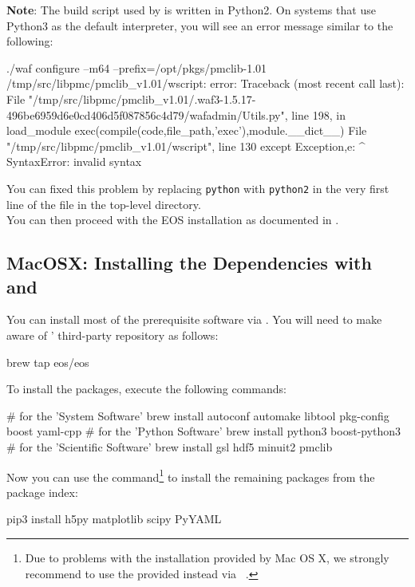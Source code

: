 \textbf{Note}: The  build script used by  is written in Python2. On
systems that use Python3 as the default interpreter, you will see an error message similar
to the following:
\begin{file}
./waf configure --m64 --prefix=/opt/pkgs/pmclib-1.01
/tmp/src/libpmc/pmclib_v1.01/wscript: error: Traceback (most recent call last):
  File "/tmp/src/libpmc/pmclib_v1.01/.waf3-1.5.17-496be6959d6e0cd406d5f087856c4d79/wafadmin/Utils.py", line 198, in load_module
    exec(compile(code,file_path,'exec'),module.__dict__)
  File "/tmp/src/libpmc/pmclib_v1.01/wscript", line 130
    except Exception,e:
                    ^
SyntaxError: invalid syntax
\end{file}
You can fixed this problem by replacing \texttt{python} with \texttt{python2} in the very first
line of the file  in the top-level  directory.\\

You can then proceed with the EOS installation as documented in .

\subsection{MacOSX: Installing the Dependencies with  and }

You can install most of the prerequisite software via .
You will need to make  aware of \EOS'
third-party repository as follows:
\begin{commandline}
brew tap eos/eos
\end{commandline}

To install the packages, execute the following commands:
\begin{commandline}
# for the 'System Software'
brew install autoconf automake libtool pkg-config boost yaml-cpp
# for the 'Python Software'
brew install python3 boost-python3
# for the 'Scientific Software'
brew install gsl hdf5 minuit2 pmclib
\end{commandline}

Now you can use the  command\footnote{%
    Due to problems with the  installation provided by Mac OS
    X, we strongly recommend to use the  provided
     instead via ~.
}
to install the remaining packages from the  package index:
\begin{commandline}
pip3 install h5py matplotlib scipy PyYAML
\end{commandline}


